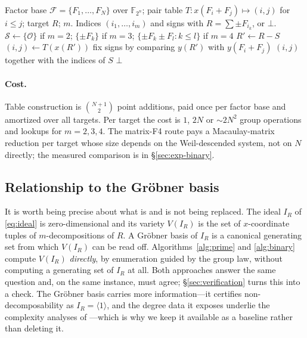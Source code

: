 \documentclass[10pt,a4paper]{article}
\theoremstyle{remark}
\newcommand{\FF}{\mathbb{F}}
\newcommand{\Fb}{\mathcal{F}}
\begin{document}
\begin{algorithm}[t]
\caption{Binary-curve $m$-decomposition by pair-sum table ($m \in \{2,3,4\}$)}
\label{alg:binary}
\begin{algorithmic}[1]
\Require Factor base $\Fb = \{F_1,\ldots,F_N\}$ over $\FF_{2^n}$;
  pair table $T: x(F_i + F_j) \mapsto (i,j)$ for $i \le j$; target $R$; $m$.
\Ensure Indices $(i_1,\ldots,i_m)$ and signs with $R = \sum \pm F_{i_k}$, or $\bot$.
\State $\mathcal{S} \gets \{\mathcal{O}\}$ if $m = 2$;\;
  $\{\pm F_k\}$ if $m = 3$;\;
  $\{\pm F_k \pm F_l : k \le l\}$ if $m = 4$ 
  \State $R' \gets R - S$
    \State $(i, j) \gets T(x(R'))$
    \State fix signs by comparing $y(R')$ with $y(F_i + F_j)$
    \State \Return $(i, j)$ together with the indices of $S$
  \EndIf
\EndFor
\State \Return $\bot$
\end{algorithmic}
\end{algorithm}

\paragraph{Cost.} Table construction is $\binom{N+1}{2}$ point
additions, paid once per factor base and amortized over all targets.
Per target the cost is $1$, $2N$ or $\sim 2N^2$ group operations and
lookups for $m = 2, 3, 4$. The matrix-F4 route pays a Macaulay-matrix
reduction per target whose size depends on the Weil-descended system,
not on $N$ directly; the measured comparison is in
\S\ref{sec:exp-binary}.

\subsection{Relationship to the Gr\"obner basis}
\label{sec:relationship}

It is worth being precise about what is and is not being replaced. The
ideal $I_R$ of \eqref{eq:ideal} is zero-dimensional and its variety
$V(I_R)$ is the set of $x$-coordinate tuples of $m$-decompositions of
$R$. A Gr\"obner basis of $I_R$ is a canonical generating set from which
$V(I_R)$ can be read off. Algorithms~\ref{alg:prime} and
\ref{alg:binary} compute $V(I_R)$ \emph{directly}, by enumeration
guided by the group law, without computing a generating set of $I_R$ at
all. Both approaches answer the same question and, on the same instance,
must agree; \S\ref{sec:verification} turns this into a check. The
Gr\"obner basis carries more information---it certifies
non-decomposability as $I_R = \langle 1 \rangle$, and the degree data it
exposes underlie the complexity analyses of
\cite{fppr2012,petitquisquater2012}---which is why we keep it available
as a baseline rather than deleting it.
\end{document}
